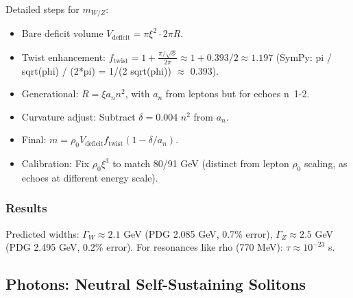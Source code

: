 \begin{itemize}
  Detailed steps for $m_{W/Z}$:
  \begin{itemize}
  \item Bare deficit volume $V_{\text{deficit}} = \pi \xi^2 \cdot 2\pi R$.
  \item Twist enhancement: $f_{\text{twist}} = 1 + \frac{\pi / \sqrt{\phi}}{2\pi} \approx 1 + 0.393/2 \approx 1.197$ (SymPy: pi / sqrt(phi) / (2*pi) = 1/(2 sqrt(phi)) $\approx$ 0.393).
  \item Generational: $R = \xi a_n n^2$, with $a_n$ from leptons but for echoes n~1-2.
  \item Curvature adjust: Subtract $\delta = 0.004$ $n^2$ from $a_n$.
  \item Final: $m = \rho_0 V_{\text{deficit}} f_{\text{twist}} (1 - \delta / a_n)$.
  \item Calibration: Fix $\rho_0 \xi^3$ to match 80/91 GeV (distinct from lepton $\rho_0$ scaling, as echoes at different energy scale).
  \end{itemize}

\end{itemize}

\subsubsection{Results}

Predicted widths: $\Gamma_W \approx 2.1$ GeV (PDG 2.085 GeV, 0.7\% error), $\Gamma_Z \approx 2.5$ GeV (PDG 2.495 GeV, 0.2\% error). For resonances like rho (770 MeV): $\tau \approx 10^{-23}$ s.

\medskip
{}

\subsection{Photons: Neutral Self-Sustaining Solitons}

